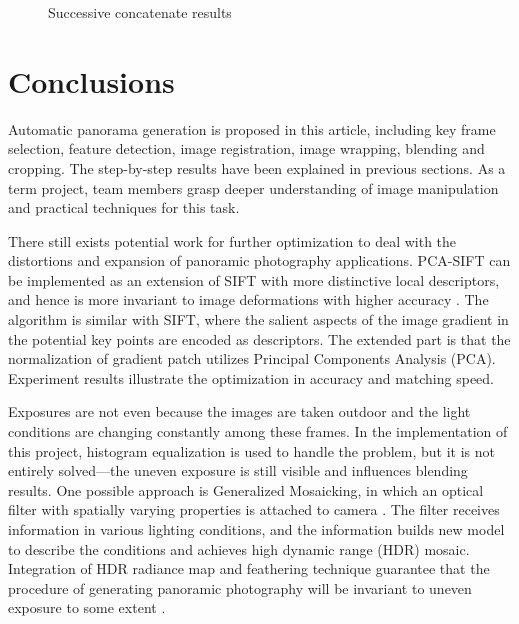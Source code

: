 \documentclass[runningheads]{llncs}
\begin{document}
\begin{figure}[h!]
\qquad
{}

\qquad
{}

\qquad
{}

\centering
{}

\caption{Successive concatenate results}
\label{fig:stitch}

\end{figure}


\section{Conclusions}

Automatic panorama generation is proposed in this article, including key frame selection, feature detection, image registration, image wrapping, blending and cropping. The step-by-step results have been explained in previous sections. As a term project, team members grasp deeper understanding of image manipulation and practical techniques for this task.

There still exists potential work for further optimization to deal with the distortions and expansion of panoramic photography applications. PCA-SIFT can be implemented as an extension of SIFT with more distinctive local descriptors, and hence is more invariant to image deformations with higher accuracy \cite{ke2004pca}. The algorithm is similar with SIFT, where the salient aspects of the image gradient in the potential key points are encoded as descriptors. The extended part is that the normalization of gradient patch utilizes Principal Components Analysis (PCA). Experiment results illustrate the optimization in accuracy and matching speed.

Exposures are not even because the images are taken outdoor and the light conditions are changing constantly among these frames. In the implementation of this project, histogram equalization is used to handle the problem, but it is not entirely solved---the uneven exposure is still visible and influences blending results. One possible approach is Generalized Mosaicking, in which an optical filter with spatially varying properties is attached to camera \cite{schechner2003generalized}. The filter receives information in various lighting conditions, and the information builds new model to describe the conditions and achieves high dynamic range (HDR) mosaic. Integration of HDR radiance map and feathering technique guarantee that the procedure of generating panoramic photography will be invariant to uneven exposure to some extent \cite{jain2013review}.
\end{document}
